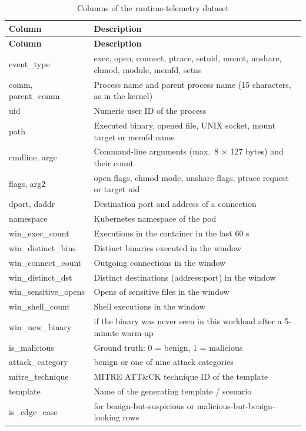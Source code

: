 \begin{longtable}{>{\ttfamily\footnotesize}p{4.0cm} >{\raggedright\arraybackslash}p{9.1cm}}
\caption{Columns of the runtime-telemetry dataset}\label{tab:schema}\\
\toprule
\normalfont\textbf{Column} & \textbf{Description} \\
\midrule
\endfirsthead
\toprule
\normalfont\textbf{Column} & \textbf{Description} \\
\midrule
\endhead
event\_type & exec, open, connect, ptrace, setuid, mount, unshare, chmod, module, memfd, setns \\
comm, parent\_comm & Process name and parent process name (15 characters, as in the kernel) \\
uid & Numeric user ID of the process \\
path & Executed binary, opened file, UNIX socket, mount target or memfd name \\
cmdline, argc & Command-line arguments (max.\ 8 $\times$ 127 bytes) and their count \\
flags, arg2 & open flags, chmod mode, unshare flags, ptrace request or target uid \\
dport, daddr & Destination port and address of a connection \\
namespace & Kubernetes namespace of the pod \\
win\_exec\_count & Executions in the container in the last 60 s \\
win\_distinct\_bins & Distinct binaries executed in the window \\
win\_connect\_count & Outgoing connections in the window \\
win\_distinct\_dst & Distinct destinations (address:port) in the window \\
win\_sensitive\_opens & Opens of sensitive files in the window \\
win\_shell\_count & Shell executions in the window \\
win\_new\_binary & 1 if the binary was never seen in this workload after a 5-minute warm-up \\
is\_malicious & Ground truth: 0 = benign, 1 = malicious \\
attack\_category & benign or one of nine attack categories \\
mitre\_technique & MITRE ATT\&CK technique ID of the template \\
template & Name of the generating template / scenario \\
is\_edge\_case & 1 for benign-but-suspicious or malicious-but-benign-looking rows \\
\bottomrule
\end{longtable}


